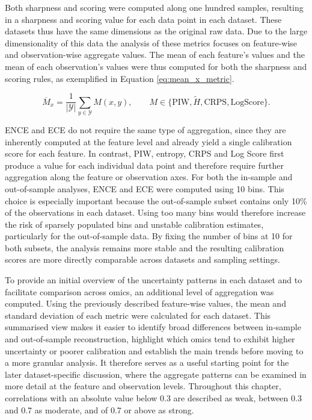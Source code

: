 Both sharpness and scoring were computed along one hundred samples, resulting in a sharpness and scoring value for each data point in each dataset. These datasets thus have the same dimensions as the original raw data. Due to the large dimensionality of this data the analysis of these metrics focuses on feature-wise and observation-wise aggregate values. The mean of each feature's values and the mean of each observation's values were thus computed for both the sharpness and scoring rules, as exemplified in Equation \ref{eq:mean_x_metric}.

\begin{equation} \label{eq:mean_x_metric}
\overline{M}_x
= \frac{1}{|\mathcal{Y}|} \sum_{y \in \mathcal{Y}} M(x,y),
\qquad
M \in \{\mathrm{PIW}, \widetilde{H}, \mathrm{CRPS}, \mathrm{LogScore}\}.
\end{equation}

ENCE and ECE do not require the same type of aggregation, since they are inherently computed at the feature level and already yield a single calibration score for each feature. In contrast, PIW, entropy, CRPS and Log Score first produce a value for each individual data point and therefore require further aggregation along the feature or observation axes. For both the in-sample and out-of-sample analyses, ENCE and ECE were computed using 10 bins. This choice is especially important because the out-of-sample subset contains only 10\% of the observations in each dataset. Using too many bins would therefore increase the risk of sparsely populated bins and unstable calibration estimates, particularly for the out-of-sample data. By fixing the number of bins at 10 for both subsets, the analysis remains more stable and the resulting calibration scores are more directly comparable across datasets and sampling settings.

To provide an initial overview of the uncertainty patterns in each dataset and to facilitate comparison across omics, an additional level of aggregation was computed. Using the previously described feature-wise values, the mean and standard deviation of each metric were calculated for each dataset. This summarised view makes it easier to identify broad differences between in-sample and out-of-sample reconstruction, highlight which omics tend to exhibit higher uncertainty or poorer calibration and establish the main trends before moving to a more granular analysis. It therefore serves as a useful starting point for the later dataset-specific discussion, where the aggregate patterns can be examined in more detail at the feature and observation levels. Throughout this chapter, correlations with an absolute value below 0.3 are described as weak, between 0.3 and 0.7 as moderate, and of 0.7 or above as strong.

